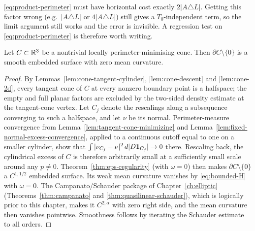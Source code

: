 \begin{test}\label{test:product-cost}
\eqref{eq:product-perimeter} must have horizontal cost exactly
$2|A\triangle L|$.  Getting this factor wrong (e.g.\ $|A\triangle L|$ or
$4|A\triangle L|$) still gives a $T_0$-independent term, so the limit
argument still works and the error is invisible.  A regression test on
\eqref{eq:product-perimeter} is therefore worth writing.
\end{test}

\begin{lemma}\label{lem:cone-smooth}
Let $C\subset\mathbb R^3$ be a nontrivial locally perimeter-minimising cone.  Then
$\partial C\setminus\{0\}$ is a smooth embedded surface with zero mean
curvature.
\end{lemma}

\begin{proof}
By Lemmas~\ref{lem:cone-tangent-cylinder}, \ref{lem:cone-descent} and
\ref{lem:cone-2d}, every tangent cone of $C$ at every nonzero boundary point
is a halfspace; the empty and full planar factors are excluded by the
two-sided density estimate at the tangent-cone vertex.  Let $C_j$ denote the
rescalings along a subsequence converging to such a halfspace, and let $\nu$
be its normal.  Perimeter-measure convergence from
Lemma~\ref{lem:tangent-cone-minimizing} and
Lemma~\ref{lem:fixed-normal-excess-convergence}, applied to a continuous
cutoff equal to one on a smaller cylinder, show that
$\int|\nu_{C_j}-\nu|^2\,d|D\mathbf 1_{C_j}|\to0$ there.  Rescaling back, the
cylindrical excess of $C$ is therefore arbitrarily small at a sufficiently
small scale around any $p\ne0$.
Theorem~\ref{thm:eps-regularity} (with $\omega=0$) then makes
$\partial C\setminus\{0\}$ a $C^{1,1/2}$ embedded surface.  Its weak mean
curvature vanishes by \eqref{eq:bounded-H} with $\omega=0$.  The
Campanato/Schauder package of Chapter~\ref{ch:elliptic}
(Theorems~\ref{thm:campanato} and \ref{thm:quasilinear-schauder}), which is
logically prior to this chapter, makes it $C^{2,\alpha}$ with zero right side, and
the mean curvature then vanishes pointwise.  Smoothness follows by iterating
the Schauder estimate to all orders.
\end{proof}

